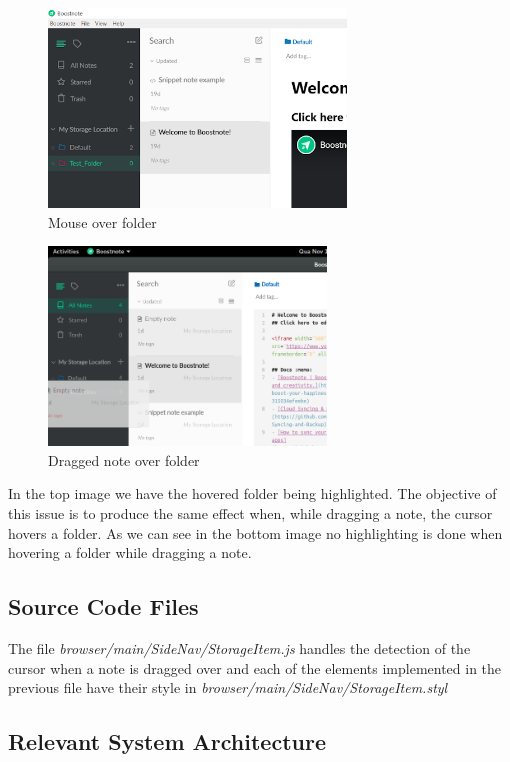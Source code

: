 \begin{figure}
\centering
\includegraphics[height=2.08333in]{../hoveredWithMouseEx.png}
\caption{Mouse over folder}
\end{figure}

\begin{figure}
\centering
\includegraphics[height=2.08333in]{../hoveredWithNoteEx.png}
\caption{Dragged note over folder}
\end{figure}

In the top image we have the hovered folder being highlighted. The
objective of this issue is to produce the same effect when, while
dragging a note, the cursor hovers a folder. As we can see in the bottom
image no highlighting is done when hovering a folder while dragging a
note.

\subsection{Source Code Files}\label{source-code-files-1}

The file \emph{browser/main/SideNav/StorageItem.js} handles the
detection of the cursor when a note is dragged over and each of the
elements implemented in the previous file have their style in
\emph{browser/main/SideNav/StorageItem.styl}

\subsection{Relevant System
Architecture}\label{relevant-system-architecture-1}

